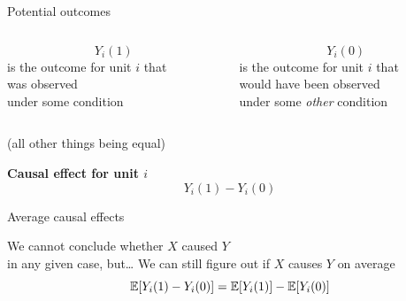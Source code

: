 \begin{frame}{Potential outcomes}
    \begin{columns}[t]
        \begin{column}{0.5\textwidth}
            \centering
            \[
                Y_{i}\!\left( 1 \right)
            \]
            is the outcome for unit $i$ that \\
            \alert{was observed} \\
            under some condition
        \end{column}
        \begin{column}{0.5\textwidth}
            \centering
            \[
                Y_{i}\!\left( 0 \right)
            \]
            is the outcome for unit $i$ that \\
            \alert{would have been observed} \\
            under some \emph{other} condition
        \end{column}
    \end{columns}
    \begin{center}
        (all other things being equal)
    \end{center}
    \vfill\pause
    \begin{center}
        \textbf{\alert{Causal effect} for unit $i$}\vspace{-1ex}
        \[
            Y_{i}\!\left( 1 \right) - Y_{i}\!\left( 0 \right)
        \]
    \end{center}
\end{frame}

\begin{frame}{Average causal effects}
    \begin{center}
        \large
        We cannot conclude whether $X$ caused $Y$ \\
        \alert{in any given case}, but\ldots
        \vfill\pause
        We can still figure out if $X$ causes $Y$ \alert{on average}
        \[
            \mathbb{E}\!\left[ Y_{i}\!\left( 1 \right) - Y_{i}\!\left( 0 \right) \right]
            = \mathbb{E}\!\left[ Y_{i}\!\left( 1 \right) \right] - \mathbb{E}\!\left[ Y_{i}\!\left( 0 \right) \right]
        \]
    \end{center}
\end{frame}

